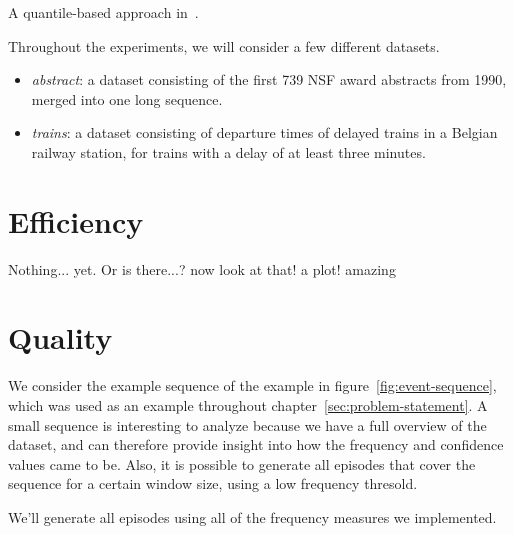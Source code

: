 A quantile-based approach in~\citep{feremans2018mining}.

Throughout the experiments, we will consider a few different datasets.

\begin{itemize}
\item \emph{abstract}: a dataset consisting of the first 739 NSF award abstracts from 1990, merged into one long sequence.
\item \emph{trains}: a dataset consisting of departure times of delayed trains in a Belgian railway station, for trains with a delay of at least three minutes.
\end{itemize}

\section{Efficiency}

Nothing... yet. Or is there...? now look at that! a plot! amazing


\section{Quality}

We consider the example sequence of the example in figure~\ref{fig:event-sequence}, which was used as an example throughout chapter~\ref{sec:problem-statement}. A small sequence is interesting to analyze because we have a full overview of the dataset, and can therefore provide insight into how the frequency and confidence values came to be. Also, it is possible to generate all episodes that cover the sequence for a certain window size, using a low frequency thresold.

We'll generate all episodes using all of the frequency measures we implemented.

\begin{table}

\begin{tabulary}{\textwidth}{ L|R|R|R }



\end{tabulary}

\end{table}
